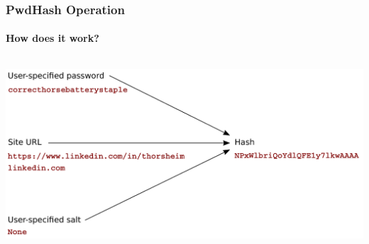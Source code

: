 \documentclass[handout, notes=hide]{beamer}
\begin{document}

\begin{frame}
\frametitle{PwdHash Operation}
\framesubtitle{How does it work?}
\setlength{\parskip}{0.5em}

\begin{columns}[T]
\begin{column}[T]{1.1\textwidth}
\vspace{0.0em}
\includegraphics[width=1.0\textwidth]{process04}
\end{column}
\end{columns}


\end{frame}

\end{document}
